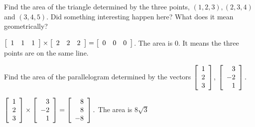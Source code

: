 \begin{enumialphparenastyle}
\begin{ex} Find the area of the triangle determined by the three points, $\left(
1,2,3\right) ,\left( 2,3,4\right) $ and $\left( 3,4,5\right) .$ Did
something interesting happen here? What does it mean geometrically?
\begin{sol}
$\left[
\begin{array}{rrr}
1 & 1 & 1
\end{array}
\right] \times \left[
\begin{array}{rrr}
 2 & 2 & 2
\end{array}
\right] =\left[
\begin{array}{ccc}
0 & 0 & 0
\end{array}
\right] $.  The area is 0. It means the three points are on the same line.
\end{sol}
\end{ex}

\begin{ex} Find the area of the parallelogram determined by the vectors $\left[
\begin{array}{r}
1 \\
2 \\
3
\end{array}
\right] $, $\left[
\begin{array}{r}
3 \\
-2 \\
1
\end{array}
\right] .$
\begin{sol}
$\left[ \begin{array}{r}
1 \\
2 \\
3
\end{array}
\right] \times
\left[
\begin{array}{r}
3 \\
-2 \\
1
\end{array}
\right] =\left[ \begin{array}{r}
8 \\
8 \\
-8
\end{array}
\right] .$ The area is $8\sqrt{3}$
\end{sol}
\end{ex}



\end{enumialphparenastyle}
